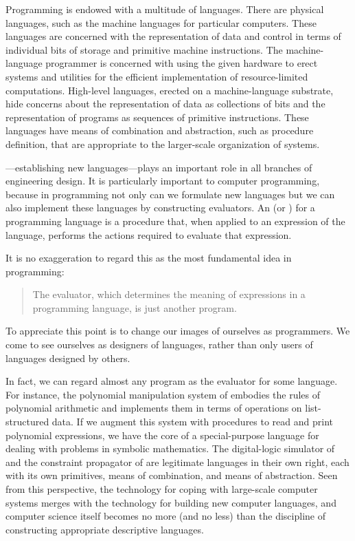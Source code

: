 Programming is endowed with a multitude of languages.  There are physical
languages, such as the machine languages for particular computers.  These
languages are concerned with the representation of data and control in terms of
individual bits of storage and primitive machine instructions.  The
machine-language programmer is concerned with using the given hardware to erect
systems and utilities for the efficient implementation of resource-limited
computations.  High-level languages, erected on a machine-language substrate,
hide concerns about the representation of data as collections of bits and the
representation of programs as sequences of primitive instructions.  These
languages have means of combination and abstraction, such as procedure
definition, that are appropriate to the larger-scale organization of systems.

---establishing new languages---plays an
important role in all branches of engineering design.  It is particularly
important to computer programming, because in programming not only can we
formulate new languages but we can also implement these languages by
constructing evaluators.  An  (or ) for
a programming language is a procedure that, when applied to an expression of
the language, performs the actions required to evaluate that expression.

It is no exaggeration to regard this as the most fundamental idea in
programming:

\begin{quote}
The evaluator, which determines the meaning of expressions in a programming
language, is just another program.
\end{quote}

\noindent
To appreciate this point is to change our images of ourselves as programmers.
We come to see ourselves as designers of languages, rather than only users of
languages designed by others.

In fact, we can regard almost any program as the evaluator for some language.
For instance, the polynomial manipulation system of 
embodies the rules of polynomial arithmetic and implements them in terms of
operations on list-structured data.  If we augment this system with procedures
to read and print polynomial expressions, we have the core of a special-purpose
language for dealing with problems in symbolic mathematics.  The digital-logic
simulator of  and the constraint propagator of
 are legitimate languages in their own right, each with its own
primitives, means of combination, and means of abstraction.  Seen from this
perspective, the technology for coping with large-scale computer systems merges
with the technology for building new computer languages, and computer science
itself becomes no more (and no less) than the discipline of constructing
appropriate descriptive languages.

